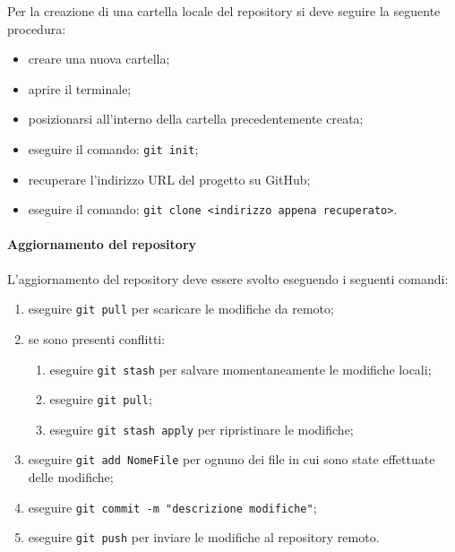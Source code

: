 	  Per la creazione di una cartella locale del repository si deve seguire la seguente procedura:
	  \begin{itemize}
	  	\item creare una nuova cartella;
	  	\item aprire il terminale;
	  	\item posizionarsi all'interno della cartella precedentemente creata;
	  	\item eseguire il comando: \texttt{git init};
	  	\item recuperare l'indirizzo URL del progetto su GitHub;
	  	\item eseguire il comando: \texttt{git clone <indirizzo appena recuperato>}.
	  \end{itemize}
	  \paragraph{Aggiornamento del repository} \label{sec:commit}
	  L'aggiornamento del repository deve essere svolto eseguendo i seguenti comandi:
	  \begin{enumerate}
	  	\item eseguire \texttt{git pull} per scaricare le modifiche da remoto;
	  	\item se sono presenti conflitti:
	  	\begin{enumerate}
	  		\item eseguire \texttt{git stash} per salvare momentaneamente le modifiche locali;
	  		\item eseguire \texttt{git pull};
	  		\item eseguire \texttt{git stash apply} per ripristinare le modifiche;
	  	\end{enumerate}
	  	\item eseguire \texttt{git add NomeFile} per ognuno dei file in cui sono state effettuate delle modifiche;
	  	\item eseguire \texttt{git commit -m "descrizione modifiche"};
	  	\item eseguire \texttt{git push} per inviare le modifiche al repository remoto.
	  \end{enumerate}
